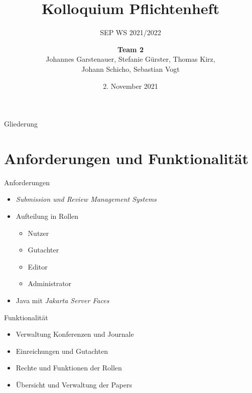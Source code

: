 \documentclass{beamer}
\title{Kolloquium Pflichtenheft}
\subtitle{SEP WS 2021/2022}
\date{\small 2. November 2021}
\author{\textbf{Team 2} \\ \small {Johannes Garstenauer, Stefanie Gürster, Thomas Kirz,\\ Johann Schicho, Sebastian Vogt} \normalsize}
\begin{document}
	\begin{frame}
		\titlepage
	\end{frame}

	\begin{frame}{Gliederung}
		\tableofcontents
	\end{frame}

\section{Anforderungen und Funktionalität}

\begin{frame}{Anforderungen}
	\begin{itemize}
		\item \emph{Submission und Review Management Systems}
		\pause %

		\item Aufteilung in Rollen
		\begin{itemize}
			\item Nutzer
			\item Gutachter
			\item Editor
			\item Administrator
		\end{itemize}
		\pause

		\item Java mit \emph{Jakarta Server Faces}

	\end{itemize}
\end{frame}

\begin{frame}{Funktionalität}
	\begin{itemize}
		\item Verwaltung Konferenzen und Journale
		\pause
		\item Einreichungen und Gutachten
		\pause
		\item Rechte und Funktionen der Rollen
		\pause
		\item Übersicht und Verwaltung der Papers
	\end{itemize}
\end{frame}
\end{document}
